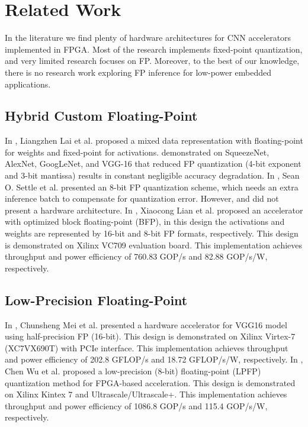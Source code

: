 \section{Related Work}
\label{sec:related_work}
In the literature we find plenty of hardware architectures for CNN accelerators implemented in FPGA. Most of the research implements fixed-point quantization, and very limited research focuses on FP. Moreover, to the best of our knowledge, there is no research work exploring FP inference for low-power embedded applications.


\subsection{Hybrid Custom Floating-Point}
In \cite{lai2017deep}, Liangzhen Lai et al. proposed a mixed data representation with floating-point for weights and fixed-point for activations. \cite{lai2017deep} demonstrated on SqueezeNet, AlexNet, GoogLeNet, and VGG-16 that reduced FP quantization (4-bit exponent and 3-bit mantissa) results in constant negligible accuracy degradation. In \cite{settle2018quantizing}, Sean O. Settle et al. presented an 8-bit FP quantization scheme, which needs an extra inference batch to compensate for quantization error. However, \cite{lai2017deep} and \cite{settle2018quantizing} did not present a hardware architecture. In \cite{lian2019high}, Xiaocong Lian et al. proposed an accelerator with optimized block floating-point (BFP), in this design the activations and weights are represented by 16-bit and 8-bit FP formats, respectively. This design is demonstrated on Xilinx VC709 evaluation board. This implementation achieves throughput and power efficiency of 760.83 GOP/s and 82.88 GOP/s/W, respectively.

\subsection{Low-Precision Floating-Point}
In \cite{mei2017200mhz}, Chunsheng Mei et al. presented a hardware accelerator for VGG16 model using half-precision FP (16-bit). This design is demonstrated on Xilinx Virtex-7 (XC7VX690T) with PCIe interface. This implementation achieves throughput and power efficiency of 202.8 GFLOP/s and 18.72 GFLOP/s/W, respectively. In \cite{wu2021low}, Chen Wu et al. proposed a low-precision (8-bit) floating-point (LPFP) quantization method for FPGA-based acceleration. This design is demonstrated on Xilinx Kintex 7 and Ultrascale/Ultrascale+. This implementation achieves throughput and power efficiency of 1086.8 GOP/s and 115.4 GOP/s/W, respectively.

